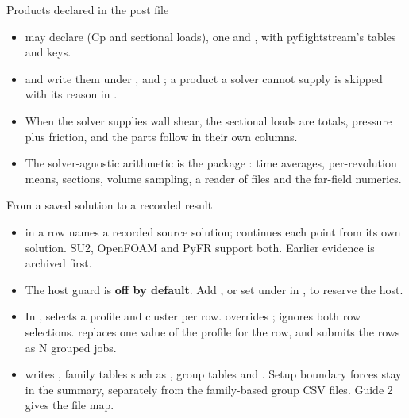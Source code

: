\begin{frame}{Products declared in the post file}
\begin{itemize}\small
  \item {} may declare \code{[sections]}
        (Cp and sectional loads), one  and
        \code{[[probes]]}, with pyflightstream's tables and keys.
  \item {} and  write them under
        ,  and ; a
        product a solver cannot supply is skipped with its reason in
        .
  \item When the solver supplies wall shear, the sectional loads are totals,
        pressure plus friction, and the parts follow in their own columns.
  \item The solver-agnostic arithmetic is the package :
        time averages, per-revolution means, sections, volume sampling, a
        reader of  files and the far-field numerics.
\end{itemize}
\end{frame}

\begin{frame}{From a saved solution to a recorded result}
\begin{itemize}\small
  \item {} in a row names a recorded source solution;
         continues each point from its own solution.
        SU2, OpenFOAM and PyFR support both. Earlier evidence is archived first.
  \item The host guard is \textbf{off by default}. Add
        , or set 
        under \code{[solver]} in , to reserve the host.
  \item In , 
        selects a profile and cluster per row.  overrides
        ;  ignores both row selections.
         replaces one value of the profile for the
        row, and  submits the rows as N grouped jobs.
  \item {} writes , family tables such as
        , group tables and .
        Setup \code{[groups]} boundary forces stay in the summary, separately
        from the family-based group CSV files. Guide 2 gives the file map.
\end{itemize}
\end{frame}
